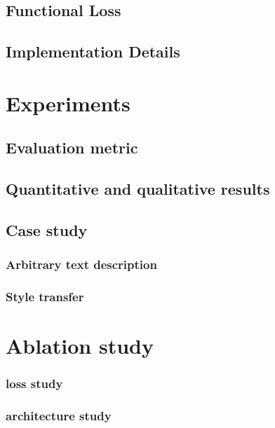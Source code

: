\documentclass[10pt,twocolumn,letterpaper]{article}
\begin{document}
\subsection{Functional Loss}

\subsection{Implementation Details}



\section{Experiments}
\subsection{Evaluation metric}
\subsection{Quantitative and qualitative results}

\subsection{Case study}
\subsubsection{Arbitrary text description}
\subsubsection{Style transfer}

\section{Ablation study}
\subsubsection{loss study}
\subsubsection{architecture study}



{\small


}
\end{document}

